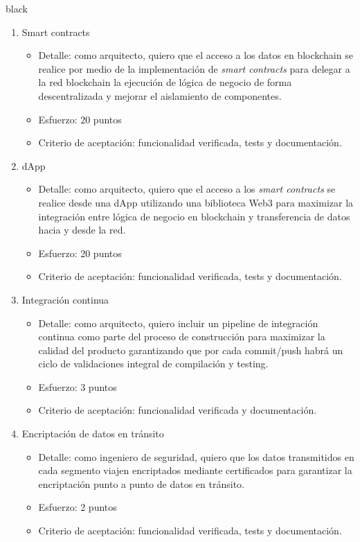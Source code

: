 \documentclass[
11pt, %
]{charter}
\begin{document}
\begin{consigna}{black}
\begin{enumerate}
	\item Smart contracts
	\begin{itemize}
		\item Detalle: como arquitecto, quiero que el acceso a los datos en blockchain se realice por medio de la implementación de \textit{smart contracts} para delegar a la red blockchain la ejecución de lógica de negocio de forma descentralizada y mejorar el aislamiento de componentes.
		\item Esfuerzo: 20 puntos
		\item Criterio de aceptación: funcionalidad verificada, tests y documentación.
	\end{itemize}
	
	\item dApp
	\begin{itemize}
		\item Detalle: como arquitecto, quiero que el acceso a los \textit{smart contracts} se realice desde una dApp utilizando una biblioteca Web3 para maximizar la integración entre lógica de negocio en blockchain y transferencia de datos hacia y desde la red.
		\item Esfuerzo: 20 puntos
		\item Criterio de aceptación: funcionalidad verificada, tests y documentación.
	\end{itemize}
	
	\item Integración continua
	\begin{itemize}
		\item Detalle: como arquitecto, quiero incluir un pipeline de integración continua como parte del proceso de construcción para maximizar la calidad del producto garantizando que por cada commit/push habrá un ciclo de validaciones integral de compilación y testing.
		\item Esfuerzo: 3 puntos
		\item Criterio de aceptación: funcionalidad verificada y documentación.
	\end{itemize}

	\item Encriptación de datos en tránsito
	\begin{itemize}
		\item Detalle: como ingeniero de seguridad, quiero que los datos transmitidos en cada segmento viajen encriptados mediante certificados para garantizar la encriptación punto a punto de datos en tránsito.
		\item Esfuerzo: 2 puntos
		\item Criterio de aceptación: funcionalidad verificada, tests y documentación.
	\end{itemize}


\end{enumerate}
\end{consigna}
\end{document}
